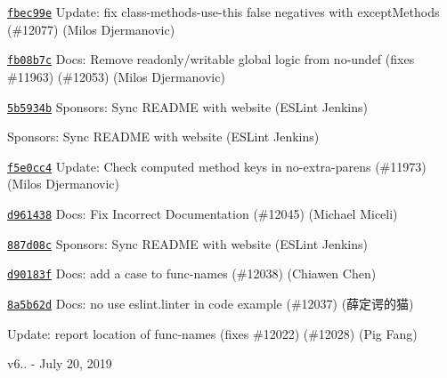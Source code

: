\begin{DoxyItemize}
\item \href{https://github.com/eslint/eslint/commit/fbec99ea3e39316791685652c66e522d698f52d8}{\texttt{ {\ttfamily fbec99e}}} Update\+: fix class-\/methods-\/use-\/this false negatives with except\+Methods (\#12077) (Milos Djermanovic)
\item \href{https://github.com/eslint/eslint/commit/fb08b7c9d28bc68864eb940e26df274059228b6a}{\texttt{ {\ttfamily fb08b7c}}} Docs\+: Remove readonly/writable global logic from no-\/undef (fixes \#11963) (\#12053) (Milos Djermanovic)
\item \href{https://github.com/eslint/eslint/commit/5b5934b9513f9114f5bf8e12ff4f4981590d64d3}{\texttt{ {\ttfamily 5b5934b}}} Sponsors\+: Sync README with website (ESLint Jenkins)
\item \href{https://github.com/eslint/eslint/commit/915676022a100ae5dba788fa3329d34b3c1f18d3}{\texttt{ {}}} Sponsors\+: Sync README with website (ESLint Jenkins)
\item \href{https://github.com/eslint/eslint/commit/f5e0cc40795f175692acb05daaadb91e9e5ae5d3}{\texttt{ {\ttfamily f5e0cc4}}} Update\+: Check computed method keys in no-\/extra-\/parens (\#11973) (Milos Djermanovic)
\item \href{https://github.com/eslint/eslint/commit/d9614388df8cfb977842ed7ac4725d76a3e05df3}{\texttt{ {\ttfamily d961438}}} Docs\+: Fix Incorrect Documentation (\#12045) (Michael Miceli)
\item \href{https://github.com/eslint/eslint/commit/887d08c244e32f1fc18359e63380e2cdb0cb3797}{\texttt{ {\ttfamily 887d08c}}} Sponsors\+: Sync README with website (ESLint Jenkins)
\item \href{https://github.com/eslint/eslint/commit/d90183ff6757cff854f4ca4d25b835143dfb4b21}{\texttt{ {\ttfamily d90183f}}} Docs\+: add a case to func-\/names (\#12038) (Chiawen Chen)
\item \href{https://github.com/eslint/eslint/commit/8a5b62de2ae574f416c0f8ad91205da9b1837275}{\texttt{ {\ttfamily 8a5b62d}}} Docs\+: no use eslint.\+linter in code example (\#12037) (薛定谔的猫)
\item \href{https://github.com/eslint/eslint/commit/58317673210e48be3975e317c2c566fae155c94f}{\texttt{ {}}} Update\+: report location of func-\/names (fixes \#12022) (\#12028) (Pig Fang)
\end{DoxyItemize}

v6.. -\/ July 20, 2019


